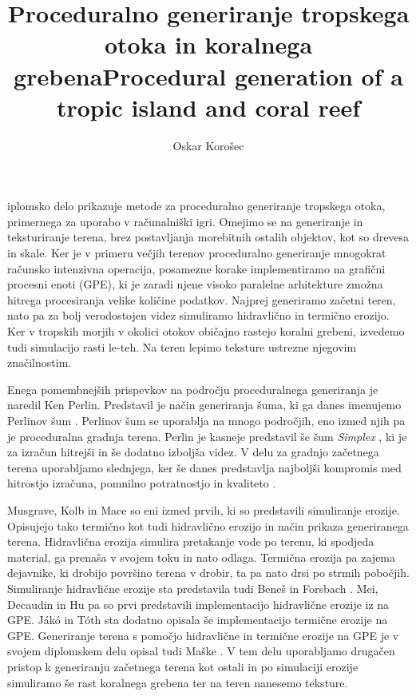 \documentclass[9pt]{style/friteza}
\title[slovene]{Proceduralno generiranje tropskega otoka in koralnega grebena}
\title[english]{Procedural generation of a tropic island and coral reef}
\author{Oskar Korošec}
\begin{document}
\maketitle

iplomsko delo prikazuje metode za proceduralno generiranje tropskega otoka, primernega za uporabo v računalniški igri. Omejimo se na generiranje in teksturiranje terena, brez postavljanja morebitnih ostalih objektov, kot so drevesa in skale. Ker je v primeru večjih terenov proceduralno generiranje mnogokrat računsko intenzivna operacija, posamezne korake implementiramo na grafični procesni enoti (GPE), ki je zaradi njene visoko paralelne arhitekture zmožna hitrega procesiranja velike količine podatkov. Najprej generiramo začetni teren, nato pa za bolj verodostojen videz simuliramo hidravlično in termično erozijo. Ker v tropskih morjih v okolici otokov običajno rastejo koralni grebeni, izvedemo tudi simulacijo rasti le-teh. Na teren lepimo teksture ustrezne njegovim značilnostim.

Enega pomembnejših prispevkov na področju proceduralnega generiranja je naredil Ken Perlin. Predstavil je način generiranja šuma, ki ga danes imenujemo Perlinov šum \cite{perlin_noise_85}. Perlinov šum se uporablja na mnogo področjih, eno izmed njih pa je proceduralna gradnja terena. Perlin je kasneje predstavil še šum \emph{Simplex} \cite{simplex_noise_01}, ki je za izračun hitrejši in še dodatno izboljša videz. V delu za gradnjo začetnega terena uporabljamo slednjega, ker še danes predstavlja najboljši kompromis med hitrostjo izračuna, pomnilno potratnostjo in kvaliteto \cite{rose2016algorithms}.

Musgrave, Kolb in Mace \cite{synthesis_first_89} so eni izmed prvih, ki so predstavili simuliranje erozije. Opisujejo tako termično kot tudi hidravlično erozijo in način prikaza generiranega terena. Hidravlična erozija simulira pretakanje vode po terenu, ki spodjeda material, ga prenaša v svojem toku in nato odlaga. Termična erozija pa zajema dejavnike, ki drobijo površino terena v drobir, ta pa nato drsi po strmih pobočjih. Simuliranje hidravlične erozije sta predstavila tudi Beneš in Forsbach \cite{benevs_first_02}. Mei, Decaudin in Hu \cite{benevs_fast_gpu_07} pa so prvi predstavili implementacijo hidravlične erozije iz \cite{benevs_first_02} na GPE. Jákó in Tóth \cite{jako_fast_gpu_11} sta dodatno opisala še implementacijo termične erozije na GPE. Generiranje terena s pomočjo hidravlične in termične erozije na GPE je v svojem diplomskem delu opisal tudi Maške \cite{maske_2013}. V tem delu uporabljamo drugačen pristop k generiranju začetnega terena kot ostali in po simulaciji erozije simuliramo še rast koralnega grebena ter na teren nanesemo teksture.
\end{document}
